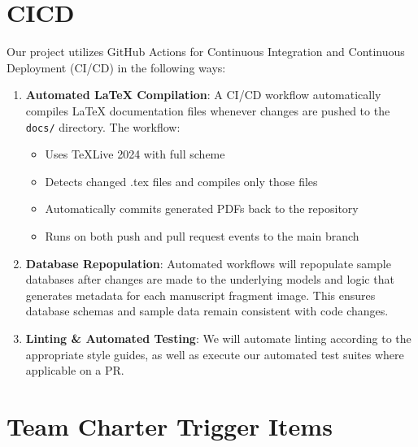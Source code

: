 \documentclass{article}
\begin{document}
\section{CICD}

Our project utilizes GitHub Actions for Continuous Integration and Continuous Deployment (CI/CD) in the following ways:

\begin{enumerate}
\item \textbf{Automated LaTeX Compilation}: A CI/CD workflow automatically compiles LaTeX documentation files whenever changes are pushed to the \texttt{docs/} directory. The workflow:
\begin{itemize}
\item Uses TeXLive 2024 with full scheme
\item Detects changed .tex files and compiles only those files
\item Automatically commits generated PDFs back to the repository
\item Runs on both push and pull request events to the main branch
\end{itemize}

\item \textbf{Database Repopulation}: Automated workflows will repopulate sample databases after changes are made to the underlying models and logic that generates metadata for each manuscript fragment image. This ensures database schemas and sample data remain consistent with code changes.

\item \textbf{Linting \& Automated Testing}: We will automate linting according to the appropriate style guides, as well as execute our automated test suites where applicable on a PR.
\end{enumerate}

\section{Team Charter Trigger Items}
\end{document}
